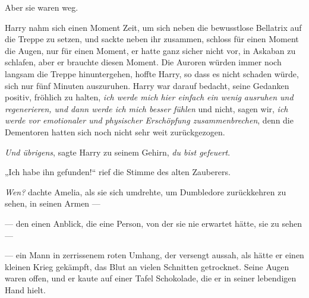 Aber sie waren weg.

Harry nahm sich einen Moment Zeit, um sich neben die bewusstlose Bellatrix auf die Treppe zu setzen, und sackte neben ihr zusammen, schloss für einen Moment die Augen, nur für einen Moment, er hatte ganz sicher nicht vor, in Askaban zu schlafen, aber er brauchte diesen Moment. Die Auroren würden immer noch langsam die Treppe hinuntergehen, hoffte Harry, so dass es nicht schaden würde, sich nur fünf Minuten auszuruhen. Harry war darauf bedacht, seine Gedanken positiv, fröhlich zu halten, \emph{ich werde mich hier einfach ein wenig} \emph{ausruhen und} \emph{regenerieren, und dann werde ich mich besser fühlen} und nicht, sagen wir, \emph{ich werde vor emotionaler und physischer Erschöpfung zusammenbrechen}, denn die Dementoren hatten sich noch nicht sehr weit zurückgezogen.

\emph{Und übrigens}, sagte Harry zu seinem Gehirn, \emph{du bist gefeuert}.

\later

„Ich habe ihn gefunden!“ rief die Stimme des alten Zauberers.

\emph{Wen?} dachte Amelia, als sie sich umdrehte, um Dumbledore zurückkehren zu sehen, in seinen Armen —

— den einen Anblick, die eine Person, von der sie nie erwartet hätte, sie zu sehen —

— ein Mann in zerrissenem roten Umhang, der versengt aussah, als hätte er einen kleinen Krieg gekämpft, das Blut an vielen Schnitten getrocknet. Seine Augen waren offen, und er kaute auf einer Tafel Schokolade, die er in seiner lebendigen Hand hielt.


